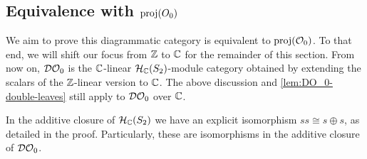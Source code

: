 
\subsection*{Equivalence with $\operatorname{proj}(O_0)$}

We aim to prove this diagrammatic category is equivalent to $\operatorname{proj}(\mathcal{O}_0)$. To that end, we will shift our focus from $\mathbb{Z}$ to $\mathbb{C}$ for the remainder of this section. From now on, $\mathcal{DO}_0$ is the $\mathbb{C}$-linear $\mathcal{H}_{\mathbb{C}}(S_2)$-module category obtained by extending the scalars of the $\mathbb{Z}$-linear version to $\mathbb{C}$. The above discussion and \autoref{lem:DO_0-double-leaves} still apply to $\mathcal{DO}_0$ over $\mathbb{C}$.

\begin{lemma}
    \label{lem:ss-equal-2s}
    In the additive closure of $\mathcal{H}_{\mathbb{C}}(S_2)$ we have an explicit isomorphism $ss \cong s \oplus s$, as detailed in the proof. Particularly, these are isomorphisms in the additive closure of $\mathcal{DO}_0$.
\end{lemma}
